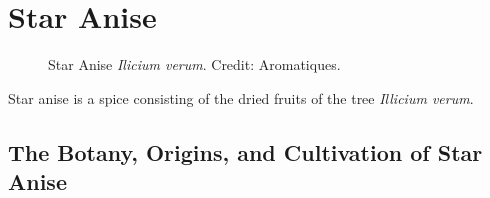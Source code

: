\section{Star Anise}
\label{sec:star_anise}



\begin{figure}[!ht]
	\vspace{-4ex}
	\centering
	\hfill
	\hfill
	\caption{Star Anise \textit{Ilicium verum}. Credit: Aromatiques.}
	\label{fig:star_anise_imgs}
\end{figure}

Star anise is a spice consisting of the dried fruits of the tree \textit{Illicium verum}. 





\subsection{The Botany, Origins, and Cultivation of Star Anise}

